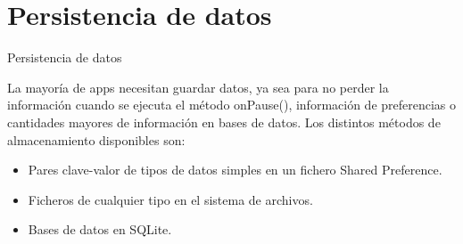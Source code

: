 \section{Persistencia de datos}
\begin{frame}{Persistencia de datos}
    \begin{block}{}
        La mayoría de apps necesitan guardar datos, ya sea para no perder la información cuando se ejecuta
        el método onPause(), información de preferencias  o cantidades mayores de información en bases de datos.
        Los distintos métodos de almacenamiento disponibles son:
    \end{block}
    \begin{itemize}
        \pause
        \item {
            Pares clave-valor de tipos de datos simples en un fichero Shared Preference.\pause
        }
        \item <2->{
            Ficheros de cualquier tipo en el sistema de archivos.\pause
        }
        \item <3->{
            Bases de datos en SQLite.
        }
    \end{itemize}
\end{frame}
